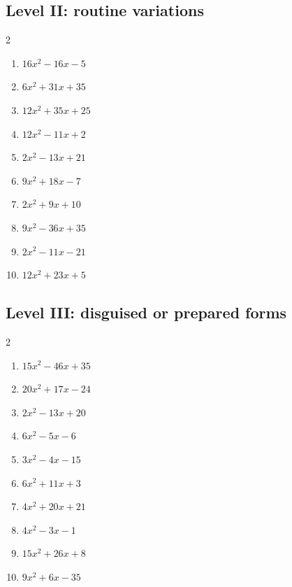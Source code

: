 \documentclass[11pt,oneside]{book}
\begin{document}
\subsection*{Level II: routine variations}
\begin{multicols}{2}
\begin{enumerate}[leftmargin=*,label=\textbf{\arabic*.},itemsep=0.65\baselineskip]
\item $ 16 x^{2} - 16 x - 5 $
\item $ 6 x^{2} + 31 x + 35 $
\item $ 12 x^{2} + 35 x + 25 $
\item $ 12 x^{2} - 11 x + 2 $
\item $ 2 x^{2} - 13 x + 21 $
\item $ 9 x^{2} + 18 x - 7 $
\item $ 2 x^{2} + 9 x + 10 $
\item $ 9 x^{2} - 36 x + 35 $
\item $ 2 x^{2} - 11 x - 21 $
\item $ 12 x^{2} + 23 x + 5 $
\end{enumerate}
\end{multicols}
\subsection*{Level III: disguised or prepared forms}
\begin{multicols}{2}
\begin{enumerate}[leftmargin=*,label=\textbf{\arabic*.},itemsep=0.65\baselineskip]
\item $ 15 x^{2} - 46 x + 35 $
\item $ 20 x^{2} + 17 x - 24 $
\item $ 2 x^{2} - 13 x + 20 $
\item $ 6 x^{2} - 5 x - 6 $
\item $ 3 x^{2} - 4 x - 15 $
\item $ 6 x^{2} + 11 x + 3 $
\item $ 4 x^{2} + 20 x + 21 $
\item $ 4 x^{2} - 3 x - 1 $
\item $ 15 x^{2} + 26 x + 8 $
\item $ 9 x^{2} + 6 x - 35 $
\end{enumerate}
\end{multicols}
\end{document}
